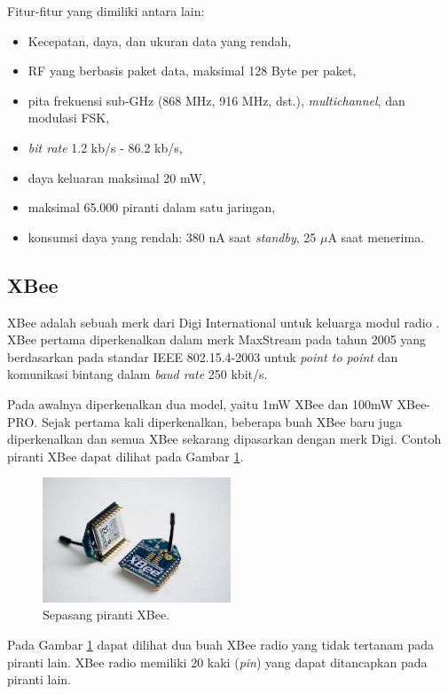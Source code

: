     Fitur-fitur yang dimiliki antara lain:
      \begin{itemize}
        \item Kecepatan, daya, dan ukuran data yang rendah,
        \item RF yang berbasis paket data, maksimal 128 Byte per paket,
        \item pita frekuensi sub-GHz (868 MHz, 916 MHz, dst.), \emph{multichannel}, dan modulasi FSK,
        \item \emph{bit rate} 1.2 kb/s - 86.2 kb/s,
        \item daya keluaran maksimal 20 mW,
        \item maksimal 65.000 piranti dalam satu jaringan,
        \item konsumsi daya yang rendah: 380 nA saat \emph{standby}, 25 $\mu$A saat menerima.
      \end{itemize}


  \subsection{XBee}
    XBee adalah sebuah merk dari Digi International untuk keluarga modul radio \cite{DigiInternationalInc.2013}. XBee pertama diperkenalkan dalam merk MaxStream pada tahun 2005 yang berdasarkan pada standar IEEE 802.15.4-2003 untuk \emph{point to point} dan komunikasi bintang dalam \emph{baud rate} 250 kbit/s.

    Pada awalnya diperkenalkan dua model, yaitu 1mW XBee dan 100mW XBee-PRO. Sejak pertama kali diperkenalkan, beberapa buah XBee baru juga diperkenalkan dan semua XBee sekarang dipasarkan dengan merk Digi. Contoh piranti XBee dapat dilihat pada Gambar \ref{xbee}.

      \begin{figure}[H]
        \centering
          \includegraphics[width=0.5\textwidth]{gambar/xbee}
          \caption{Sepasang piranti XBee.}
          \label{xbee}
      \end{figure}

    Pada Gambar \ref{xbee} dapat dilihat dua buah XBee radio yang tidak tertanam pada piranti lain. XBee radio memiliki 20 kaki (\emph{pin}) yang dapat ditancapkan pada piranti lain.

